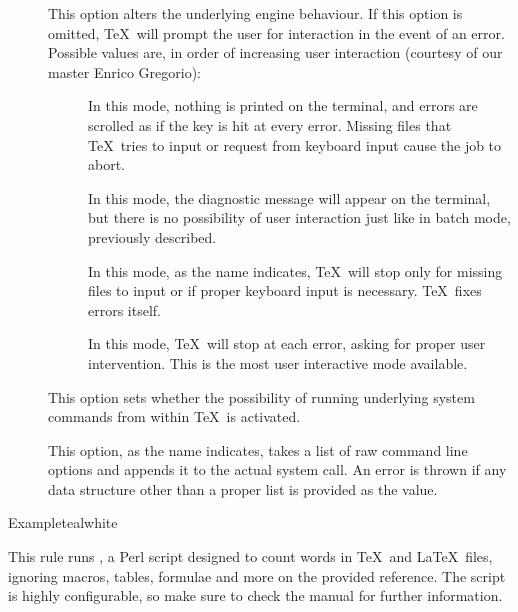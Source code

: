 \begin{description}
\begin{description}
\item[] This option alters the underlying engine behaviour. If this option is omitted, \TeX\ will prompt the user for interaction in the event of an error. Possible values are, in order of increasing user interaction (courtesy of our master Enrico Gregorio):

\begin{description}
\item[] In this mode, nothing is printed on the terminal, and errors are scrolled as if the  key is hit at every error. Missing files that \TeX\ tries to input or request from keyboard input cause the job to abort.

\item[] In this mode, the diagnostic message will appear on the terminal, but there is no possibility of user interaction just like in batch mode, previously described.

\item[] In this mode, as the name indicates, \TeX\ will stop only for missing files to input or if proper keyboard input is necessary. \TeX\ fixes errors itself.

\item[] In this mode, \TeX\ will stop at each error, asking for proper user intervention. This is the most user interactive mode available.
\end{description}

\item[] This option sets whether the possibility of running underlying system commands from within \TeX\ is activated.

\item[] This option, as the name indicates, takes a list of raw command line options and appends it to the actual system call. An error is thrown if any data structure other than a proper list is provided as the value.
\end{description}

\begin{codebox}{Example}{teal}{\icnote}{white}
\end{codebox}

\item[\rulebox{texcount}]
This rule runs , a Perl script designed to count words in \TeX\ and \LaTeX\ files, ignoring macros, tables, formulae and more on the provided  reference. The script is highly configurable, so make sure to check the manual for further information. 


\end{description}
